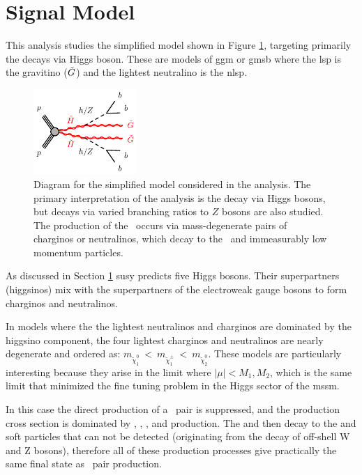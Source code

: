 
\section{Signal Model}

This analysis studies the simplified model shown in Figure \ref{fig:feyn}, targeting primarily the decays via Higgs boson.
These are models of \gls{ggm} \cite{Meade:2008wd,Cheung:2007es,Dine:1981gu,AlvarezGaume:1981wy,Nappi:1982hm} 
or \gls{gmsb} \cite{Dimopoulos:1996vz,Matchev:1999ft} where the \gls{lsp} is the gravitino ($\tilde{G}$) and 
the lightest neutralino is the \gls{nlsp}.

\begin{figure}[htbp]
	\centering
	\includegraphics[width=0.35\textwidth]{figures/ewk_prod/varie/N1N1-hhGG-bbbb_Z}
	\caption{Diagram for the simplified model considered in the analysis. The primary interpretation of the analysis is the decay via Higgs bosons, but decays via varied branching ratios to $Z$ bosons are also studied. The production of the \hino\ occurs
via mass-degenerate pairs of charginos or neutralinos, which decay to the \ninoone\ and immeasurably low momentum particles.} 
	\label{fig:feyn}
\end{figure}

As discussed in Section \ref{} \gls{susy} predicts five Higgs bosons. 
Their superpartners (higgsinos) mix with the superpartners of the electroweak gauge bosons to form charginos and neutralinos.

In models where the the lightest neutralinos and charginos are dominated by the higgsino component, the four lightest charginos 
and neutralinos are nearly degenerate \cite{Papucci:2011wy,Barbieri:2009ev,Han:2014kaa} and ordered as: $m_{\tilde\chi^0_1}~<~m_{\tilde\chi^\pm_1}~<~m_{\tilde\chi^0_2}$.
These models are particularly interesting because they arise in the limit where $|\mu| < M_1, M_2$, which is the same limit 
that minimized the fine tuning problem in the Higgs sector of the \gls{mssm}.

In this case the direct production of a \ninoone\ninoone\ pair is suppressed, and the production cross section is dominated by 
\ninoone\ninotwo, \ninoone\chinoonepm, \ninotwo\chinoonepm, and \chinoonep\chinoonem production.
The \ninotwo and \chinoonepm then decay to the \ninoone and soft particles that can not be detected (originating from the 
decay of off-shell W and Z bosons), therefore all of these production processes give practically the same final state as 
\ninoone\ninoone\  pair production. 


